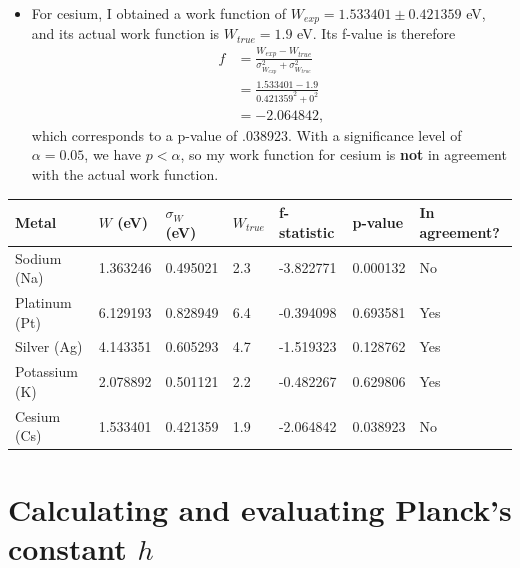 \documentclass{article}
\begin{document}
\begin{itemize}
\begin{itemize}
  \item For cesium, I obtained a work function of $W_{exp}=1.533401\pm 0.421359$ eV, and its actual work function is $W_{true}=1.9$ eV. Its f-value is therefore
    \begin{align*}
      f &= \frac{W_{exp}-W_{true}}{\sigma_{W_{exp}}^2 + \sigma_{W_{true}}^2} \\
      &= \frac{1.533401-1.9}{0.421359^2+0^2} \\
      &= -2.064842,
    \end{align*}
    which corresponds to a p-value of .038923. With a significance level of $\alpha = 0.05$, we have $p < \alpha$, so  my work function for cesium is \textbf{not} in agreement with the actual work function.
  \end{itemize}
  
  \begin{table}[ht!]
    \begin{tabular}{|l|l|l|l|l|l|l|}
      \hline
      Metal         & $W$ (eV) & $\sigma_W$ (eV) & $W_{true}$ & f-statistic & p-value  & In agreement? \\ \hline
      Sodium (Na)   & 1.363246 & 0.495021        & 2.3 & -3.822771   & 0.000132 & No \\ \hline
      Platinum (Pt) & 6.129193 & 0.828949        & 6.4 & -0.394098   & 0.693581 & Yes \\ \hline
      Silver (Ag)   & 4.143351 & 0.605293        & 4.7 & -1.519323   & 0.128762 & Yes \\ \hline
      Potassium (K) & 2.078892 & 0.501121        & 2.2 & -0.482267   & 0.629806 & Yes \\ \hline
      Cesium (Cs)   & 1.533401 & 0.421359        & 1.9 & -2.064842   & 0.038923 & No \\ \hline
    \end{tabular}
  \end{table}


\end{itemize}


\section{Calculating and evaluating Planck's constant $h$}
\end{document}
